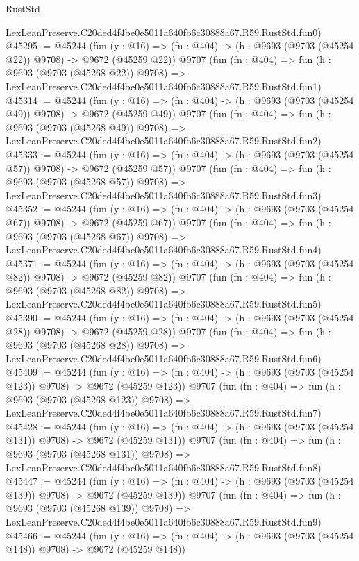 \begin{lexlean}{RustStd}
\begin{coremodule}
    LexLeanPreserve.C20ded4f4be0e5011a640fb6c30888a67.R59.RustStd.fun0)
@45295 := @45244
    (fun (y : @16) => (fn : @404) -> (h : @9693 (@9703 (@45254 @22)) @9708) -> @9672 (@45259 @22))
    @9707
    (fun (fn : @404) =>
    fun (h : @9693 (@9703 (@45268 @22)) @9708) =>
    LexLeanPreserve.C20ded4f4be0e5011a640fb6c30888a67.R59.RustStd.fun1)
@45314 := @45244
    (fun (y : @16) => (fn : @404) -> (h : @9693 (@9703 (@45254 @49)) @9708) -> @9672 (@45259 @49))
    @9707
    (fun (fn : @404) =>
    fun (h : @9693 (@9703 (@45268 @49)) @9708) =>
    LexLeanPreserve.C20ded4f4be0e5011a640fb6c30888a67.R59.RustStd.fun2)
@45333 := @45244
    (fun (y : @16) => (fn : @404) -> (h : @9693 (@9703 (@45254 @57)) @9708) -> @9672 (@45259 @57))
    @9707
    (fun (fn : @404) =>
    fun (h : @9693 (@9703 (@45268 @57)) @9708) =>
    LexLeanPreserve.C20ded4f4be0e5011a640fb6c30888a67.R59.RustStd.fun3)
@45352 := @45244
    (fun (y : @16) => (fn : @404) -> (h : @9693 (@9703 (@45254 @67)) @9708) -> @9672 (@45259 @67))
    @9707
    (fun (fn : @404) =>
    fun (h : @9693 (@9703 (@45268 @67)) @9708) =>
    LexLeanPreserve.C20ded4f4be0e5011a640fb6c30888a67.R59.RustStd.fun4)
@45371 := @45244
    (fun (y : @16) => (fn : @404) -> (h : @9693 (@9703 (@45254 @82)) @9708) -> @9672 (@45259 @82))
    @9707
    (fun (fn : @404) =>
    fun (h : @9693 (@9703 (@45268 @82)) @9708) =>
    LexLeanPreserve.C20ded4f4be0e5011a640fb6c30888a67.R59.RustStd.fun5)
@45390 := @45244
    (fun (y : @16) => (fn : @404) -> (h : @9693 (@9703 (@45254 @28)) @9708) -> @9672 (@45259 @28))
    @9707
    (fun (fn : @404) =>
    fun (h : @9693 (@9703 (@45268 @28)) @9708) =>
    LexLeanPreserve.C20ded4f4be0e5011a640fb6c30888a67.R59.RustStd.fun6)
@45409 := @45244
    (fun (y : @16) => (fn : @404) -> (h : @9693 (@9703 (@45254 @123)) @9708) -> @9672 (@45259 @123))
    @9707
    (fun (fn : @404) =>
    fun (h : @9693 (@9703 (@45268 @123)) @9708) =>
    LexLeanPreserve.C20ded4f4be0e5011a640fb6c30888a67.R59.RustStd.fun7)
@45428 := @45244
    (fun (y : @16) => (fn : @404) -> (h : @9693 (@9703 (@45254 @131)) @9708) -> @9672 (@45259 @131))
    @9707
    (fun (fn : @404) =>
    fun (h : @9693 (@9703 (@45268 @131)) @9708) =>
    LexLeanPreserve.C20ded4f4be0e5011a640fb6c30888a67.R59.RustStd.fun8)
@45447 := @45244
    (fun (y : @16) => (fn : @404) -> (h : @9693 (@9703 (@45254 @139)) @9708) -> @9672 (@45259 @139))
    @9707
    (fun (fn : @404) =>
    fun (h : @9693 (@9703 (@45268 @139)) @9708) =>
    LexLeanPreserve.C20ded4f4be0e5011a640fb6c30888a67.R59.RustStd.fun9)
@45466 := @45244
    (fun (y : @16) => (fn : @404) -> (h : @9693 (@9703 (@45254 @148)) @9708) -> @9672 (@45259 @148))

\end{coremodule}
\end{lexlean}

